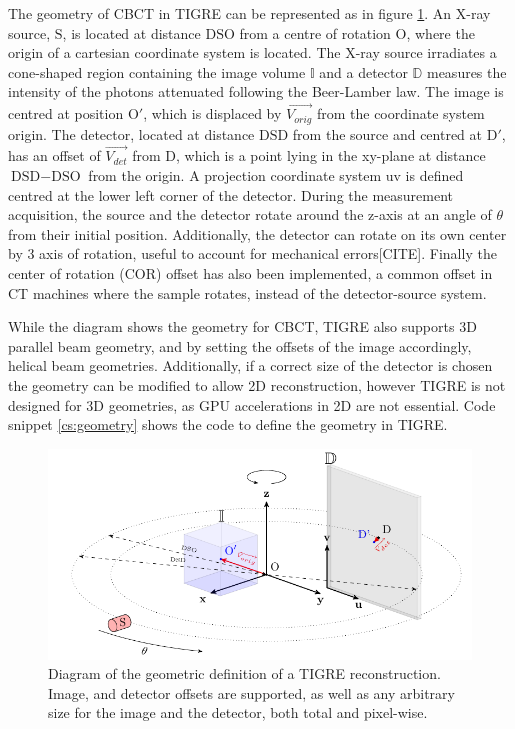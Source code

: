 The geometry of CBCT in TIGRE can be represented as in figure \ref{fig:geometryTIGRE}. An X-ray source, $\text{S}$, is located at distance $\text{DSO}$ from a centre of rotation $\text{O}$, where the origin of a cartesian coordinate system is located. The X-ray source irradiates a cone-shaped region containing the image volume $\mathbb{I}$ and a detector $\mathbb{D}$ measures the intensity of the photons attenuated following the Beer-Lamber law. The image is centred at position $\text{O}'$, which is displaced by $\overrightarrow{V_{orig}}$ from the coordinate system origin. The detector, located at distance $\text{DSD}$ from the source and centred at $\text{D}'$, has an offset of $\overrightarrow{V_{det}}$ from $\text{D}$, which is a point lying in the xy-plane at distance $\text{DSD}-\text{DSO}$ from the origin. A projection coordinate system uv is defined centred at the lower left corner of the detector. During the measurement acquisition, the source and the detector rotate around the z-axis at an angle of $\theta$ from their initial position. Additionally, the detector can rotate on its own center by 3 axis of rotation, useful to account for mechanical errors[CITE]. Finally the center of rotation (COR) offset has also been implemented, a common offset in CT machines where the sample rotates, instead of the detector-source system.

While the diagram shows the geometry for CBCT, TIGRE also supports 3D parallel beam geometry, and by setting the offsets of the image accordingly, helical beam geometries. Additionally, if a correct size of the detector is chosen the geometry can be modified to allow 2D reconstruction, however TIGRE is not designed for 3D geometries, as GPU accelerations in 2D are not essential. Code snippet \ref{cs:geometry} shows the code to define the geometry in TIGRE.

\begin{figure}
\begin{center}

\includegraphics{GPUmethods/geometrytikz-figure0.pdf} 
\end{center}

\caption{\label{fig:geometryTIGRE} Diagram of the geometric definition of a TIGRE reconstruction. Image, and detector offsets are supported, as well as any arbitrary size for the image and the detector, both total and pixel-wise.} 
\end{figure}

